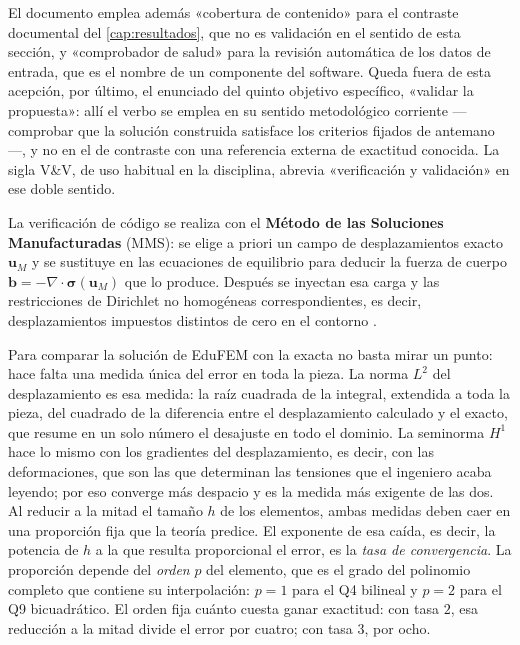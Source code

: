 El documento emplea además «cobertura de contenido» para el contraste documental del \autoref{cap:resultados}, que no es validación en el sentido de esta sección, y «comprobador de salud» para la revisión automática de los datos de entrada, que es el nombre de un componente del software. Queda fuera de esta acepción, por último, el enunciado del quinto objetivo específico, «validar la propuesta»: allí el verbo se emplea en su sentido metodológico corriente ---comprobar que la solución construida satisface los criterios fijados de antemano---, y no en el de contraste con una referencia externa de exactitud conocida. La sigla V\&V, de uso habitual en la disciplina, abrevia «verificación y validación» en ese doble sentido.

La verificación de código se realiza con el \textbf{Método de las Soluciones Manufacturadas} (MMS): se elige a priori un campo de desplazamientos exacto $\bm{u}_M$ y se sustituye en las ecuaciones de equilibrio para deducir la fuerza de cuerpo $\bm{b} = -\nabla\cdot\bm{\sigma}(\bm{u}_M)$ que lo produce. Después se inyectan esa carga y las restricciones de Dirichlet no homogéneas correspondientes, es decir, desplazamientos impuestos distintos de cero en el contorno \autocites[pp.~21, 26]{salari2000mms}[pp.~219-222]{oberkampf2010vv}.

Para comparar la solución de EduFEM con la exacta no basta mirar un punto: hace falta una medida única del error en toda la pieza. La norma $L^2$ del desplazamiento es esa medida: la raíz cuadrada de la integral, extendida a toda la pieza, del cuadrado de la diferencia entre el desplazamiento calculado y el exacto, que resume en un solo número el desajuste en todo el dominio. La seminorma $H^1$ hace lo mismo con los gradientes del desplazamiento, es decir, con las deformaciones, que son las que determinan las tensiones que el ingeniero acaba leyendo; por eso converge más despacio y es la medida más exigente de las dos. Al reducir a la mitad el tamaño $h$ de los elementos, ambas medidas deben caer en una proporción fija que la teoría predice. El exponente de esa caída, es decir, la potencia de $h$ a la que resulta proporcional el error, es la \emph{tasa de convergencia}. La proporción depende del \emph{orden} $p$ del elemento, que es el grado del polinomio completo que contiene su interpolación: $p = 1$ para el Q4 bilineal y $p = 2$ para el Q9 bicuadrático. El orden fija cuánto cuesta ganar exactitud: con tasa $2$, esa reducción a la mitad divide el error por cuatro; con tasa $3$, por ocho.

